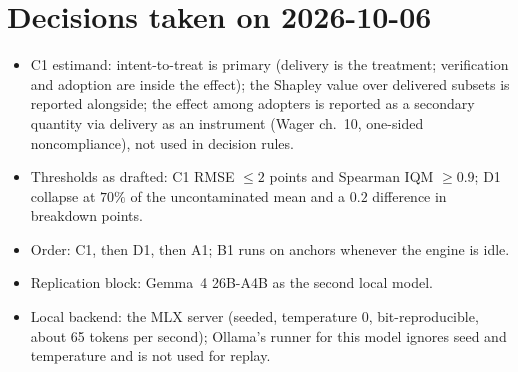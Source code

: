 \documentclass[11pt]{article}
\begin{document}
\section{Decisions taken on 2026-10-06}
\begin{itemize}
\item C1 estimand: intent-to-treat is primary (delivery is the treatment; verification and adoption are inside the
effect); the Shapley value over delivered subsets is reported alongside; the effect among adopters is reported as
a secondary quantity via delivery as an instrument (Wager ch.~10, one-sided noncompliance), not used in decision
rules.
\item Thresholds as drafted: C1 RMSE $\le2$ points and Spearman IQM $\ge0.9$; D1 collapse at $70\%$ of the
uncontaminated mean and a $0.2$ difference in breakdown points.
\item Order: C1, then D1, then A1; B1 runs on anchors whenever the engine is idle.
\item Replication block: Gemma~4 26B-A4B as the second local model.
\item Local backend: the MLX server (seeded, temperature 0, bit-reproducible, about 65 tokens per second); Ollama's
runner for this model ignores seed and temperature and is not used for replay.
\end{itemize}
\end{document}
